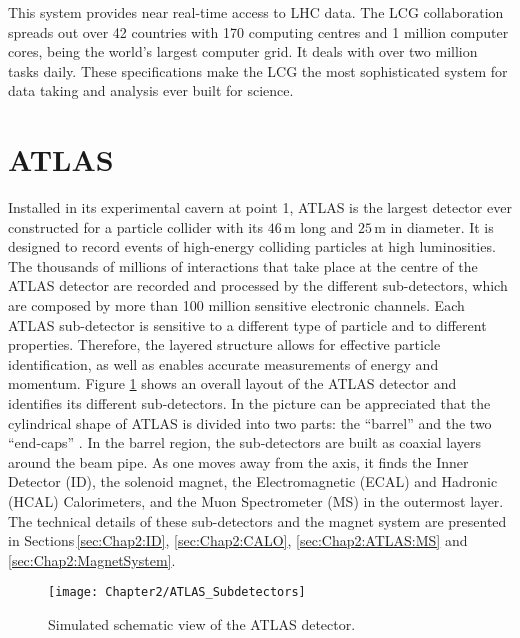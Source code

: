 This system provides near real-time access to LHC data. The LCG collaboration spreads out over 42 countries with 170 computing centres and 1 million computer cores, being the world's largest computer grid. 
It deals with  over two million tasks daily. These specifications make the LCG the most sophisticated system for data taking and analysis ever built for science.






\section{ATLAS}
\label{sec:Chap2:ATLAS}


Installed in its experimental cavern at point 1, ATLAS is the largest detector ever constructed for a particle collider with its 
$46\,$m long and $25\,$m in diameter. It is designed to record events of high-energy colliding particles at high luminosities.
The thousands of millions of interactions that take place at the centre of the ATLAS detector are recorded and processed by the
different sub-detectors, which are composed by more than 100 million sensitive electronic channels. Each ATLAS sub-detector
is sensitive to a different type of particle and to different properties. Therefore, the layered structure allows for effective particle identification, as well as  
enables accurate measurements of energy and momentum. Figure \ref{fig:Chap2:ATLAS:GeneralOverview} shows an overall layout of the ATLAS 
detector and identifies its different sub-detectors. In the picture can be appreciated that the cylindrical shape of ATLAS is divided into two parts: the ``barrel'' 
and the two ``end-caps'' . In the barrel region, the sub-detectors are built as coaxial layers around the beam pipe. %
As one moves away from the axis, it finds the Inner Detector (ID), the solenoid magnet, the Electromagnetic (ECAL) and Hadronic (HCAL) Calorimeters,
and the Muon Spectrometer (MS) in the outermost layer. 
The technical details of these sub-detectors and the magnet system are presented in Sections\,\ref{sec:Chap2:ID}, 
\ref{sec:Chap2:CALO}, \ref{sec:Chap2:ATLAS:MS} and \ref{sec:Chap2:MagnetSystem}.

\begin{figure}
	\centering
 	 \texttt{[image: Chapter2/ATLAS\_Subdetectors]}
	 \caption{Simulated schematic view of the ATLAS detector.}
	\label{fig:Chap2:ATLAS:GeneralOverview}
\end{figure}

